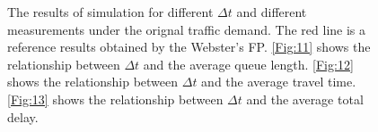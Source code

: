 \documentclass[a4paper, 10pt, conference]{ieeeconf}      %
\begin{document}
\begin{figure}[thbp]
        \centering
        \hfill
        \hfill
        \par
        \caption{The results of simulation for different $\Delta t$ and different measurements under the orignal traffic demand. 
        The red line is a reference results obtained by the Webster's FP.
        \ref{Fig:11} shows the relationship between $\Delta t$ and the average queue length. 
        \ref{Fig:12} shows the relationship between $\Delta t$ and the average travel time.
        \ref{Fig:13} shows the relationship between $\Delta t$ and the average total delay.}
        \label{fig:RESt}
\end{figure}
\end{document}
